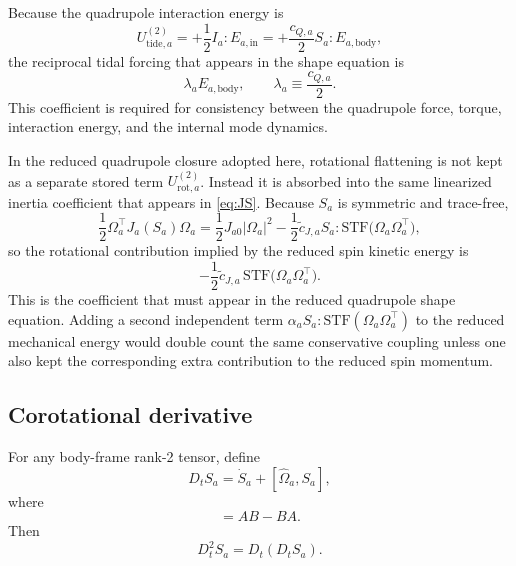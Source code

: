 \documentclass[journal, a4paper]{IEEEtran}
\begin{document}
Because the quadrupole interaction energy is
\begin{equation}
U_{\mathrm{tide},a}^{(2)}
=
+\frac{1}{2} I_a : E_{a,\mathrm{in}}
=
+\frac{c_{Q,a}}{2} S_a : E_{a,\mathrm{body}},
\label{eq:Utidequad}
\end{equation}
the reciprocal tidal forcing that appears in the shape equation is
\begin{equation}
\lambda_a E_{a,\mathrm{body}},
\qquad
\lambda_a \equiv \frac{c_{Q,a}}{2}.
\label{eq:lambdaQ}
\end{equation}
This coefficient is required for consistency between the quadrupole force,
torque, interaction energy, and the internal mode dynamics.


In the reduced quadrupole closure adopted here, rotational flattening is not
kept as a separate stored term $U_{\mathrm{rot},a}^{(2)}$. Instead it is absorbed
into the same linearized inertia coefficient that appears in \eqref{eq:JS}.
Because $S_a$ is symmetric and trace-free,
\begin{equation}
\frac{1}{2}\Omega_a^\top J_a(S_a)\Omega_a
=
\frac{1}{2}J_{a0}|\Omega_a|^2
-
\frac{1}{2}\tilde c_{J,a}
S_a:
\mathrm{STF}\!\bigl(\Omega_a\Omega_a^\top\bigr),
\label{eq:Tspinquadsplit}
\end{equation}
so the rotational contribution implied by the reduced spin kinetic energy is
\begin{equation}
-\frac{1}{2}\tilde c_{J,a}\,
\mathrm{STF}
\bigl(
\Omega_a\Omega_a^\top
\bigr).
\label{eq:Urotgrad}
\end{equation}
This is the coefficient that must appear in the reduced quadrupole shape
equation. Adding a second independent term
$\alpha_a S_a:\mathrm{STF}(\Omega_a\Omega_a^\top)$ to the reduced mechanical
energy would double count the same conservative coupling unless one also kept
the corresponding extra contribution to the reduced spin momentum.

\subsection{Corotational derivative}

For any body-frame rank-2 tensor, define
\begin{equation}
D_t S_a
=
\dot S_a + [\widehat{\Omega}_a,S_a],
\label{eq:DtS}
\end{equation}
where
\begin{equation}
[A,B]=AB-BA.
\end{equation}
Then
\begin{equation}
D_t^2 S_a = D_t(D_t S_a).
\label{eq:Dt2S}
\end{equation}
\end{document}
